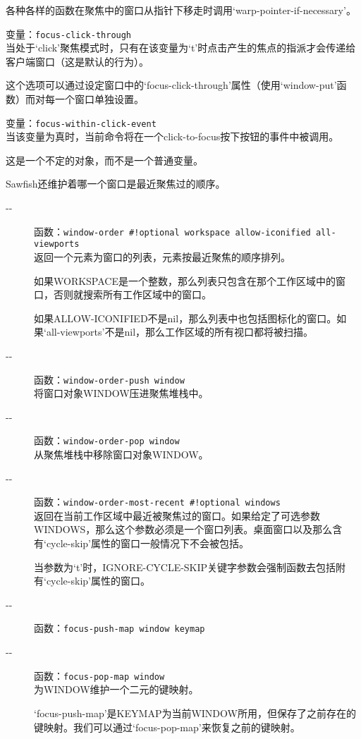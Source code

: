 \documentclass{book}
\begin{document}
\begin{CJK*}{UTF8}{gbsn}
\begin{description}
各种各样的函数在聚焦中的窗口从指针下移走时调用`warp-pointer-if-necessary'。
\item[-{}-] 变量：\verb|focus-click-through|\\
当处于`click'聚焦模式时，只有在该变量为`t'时点击产生的焦点的指派才会传递给客户端窗口（这是默认的行为）。

这个选项可以通过设定窗口中的`focus-click-through'属性（使用`window-put'函数）而对每一个窗口单独设置。
\item[-{}-] 变量：\verb|focus-within-click-event|\\
当该变量为真时，当前命令将在一个click-to-focus按下按钮的事件中被调用。

这是一个不定的对象，而不是一个普通变量。
\end{description}

Sawfish还维护着哪一个窗口是最近聚焦过的顺序。
\begin{description}
\item[-{}-] 函数：\verb|window-order #!optional workspace allow-iconified all-viewports|\\
返回一个元素为窗口的列表，元素按最近聚焦的顺序排列。

如果WORKSPACE是一个整数，那么列表只包含在那个工作区域中的窗口，否则就搜索所有工作区域中的窗口。

如果ALLOW-ICONIFIED不是nil，那么列表中也包括图标化的窗口。如果`all-viewports'不是nil，那么工作区域的所有视口都将被扫描。
\item[-{}-] 函数：\verb|window-order-push window|\\
将窗口对象WINDOW压进聚焦堆栈中。
\item[-{}-] 函数：\verb|window-order-pop window|\\
从聚焦堆栈中移除窗口对象WINDOW。
\item[-{}-] 函数：\verb|window-order-most-recent #!optional windows|\\
返回在当前工作区域中最近被聚焦过的窗口。如果给定了可选参数WINDOWS，那么这个参数必须是一个窗口列表。桌面窗口以及那么含有`cycle-skip'属性的窗口一般情况下不会被包括。

当参数为`t'时，IGNORE-CYCLE-SKIP关键字参数会强制函数去包括附有`cycle-skip'属性的窗口。
\item[-{}-] 函数：\verb|focus-push-map window keymap|\\
\item[-{}-] 函数：\verb|focus-pop-map window|\\
为WINDOW维护一个二元的键映射。

`focus-push-map'是KEYMAP为当前WINDOW所用，但保存了之前存在的键映射。我们可以通过`focus-pop-map'来恢复之前的键映射。


\end{description}
\end{CJK*}
\end{document}
